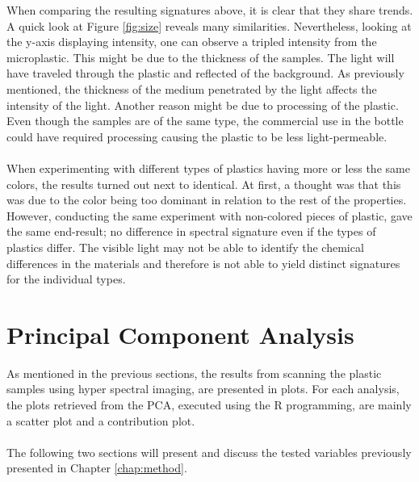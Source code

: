 \noindent
When comparing the resulting signatures above, it is clear that they share trends. A quick look at Figure \ref{fig:size} reveals many similarities. Nevertheless, looking at the y-axis displaying intensity, one can observe a tripled intensity from the microplastic. This might be due to the thickness of the samples. The light will have traveled through the plastic and reflected of the background. As previously mentioned, the thickness of the medium penetrated by the light affects the intensity of the light. Another reason might be due to processing of the plastic. Even though the samples are of the same type, the commercial use in the bottle could have required processing causing the plastic to be less light-permeable.
\\\\
When experimenting with different types of plastics having more or less the same colors, the results turned out next to identical. At first, a thought was that this was due to the color being too dominant in relation to the rest of the properties. However, conducting the same experiment with non-colored pieces of plastic, gave the same end-result; no difference in spectral signature even if the types of plastics differ. The visible light may not be able to identify the chemical differences in the materials and therefore is not able to yield distinct signatures for the individual types.


\section{Principal Component Analysis}

As mentioned in the previous sections, the results from scanning the plastic samples using hyper spectral imaging, are presented in plots. For each analysis, the plots retrieved from the PCA, executed using the R programming, are mainly a scatter plot and a contribution plot. 
\\\\
The following two sections will present and discuss the tested variables previously presented in Chapter \ref{chap:method}. 

